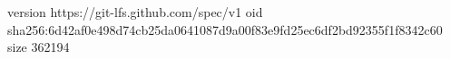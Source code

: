 version https://git-lfs.github.com/spec/v1
oid sha256:6d42af0e498d74cb25da0641087d9a00f83e9fd25ec6df2bd92355f1f8342c60
size 362194
